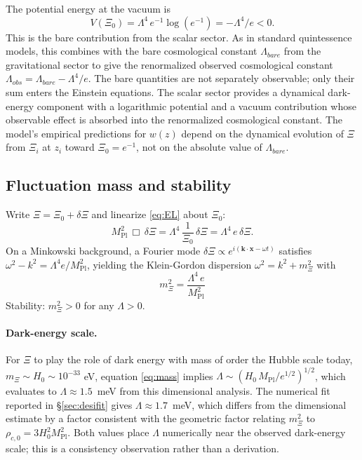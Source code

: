 \documentclass[11pt,reqno]{amsart}
\theoremstyle{plain}
\theoremstyle{definition}
\theoremstyle{remark}
\newcommand{\Pl}{\mathrm{Pl}}
\begin{document}
The potential energy at the vacuum is
\[
  V(\Xi_0) = \Lambda^{4}\,e^{-1} \log(e^{-1}) = -\Lambda^{4}/e < 0.
\]
This is the bare contribution from the scalar sector. As in standard
quintessence models, this combines with the bare cosmological constant
$\Lambda_{bare}$ from the gravitational sector to give the renormalized
observed cosmological constant $\Lambda_{obs} = \Lambda_{bare} - \Lambda^{4}/e$.
The bare quantities are not separately observable; only their sum enters
the Einstein equations. The scalar sector provides a dynamical
dark-energy component with a logarithmic potential and a vacuum
contribution whose observable effect is absorbed into the renormalized
cosmological constant. The model's empirical predictions for $w(z)$
depend on the dynamical evolution of $\Xi$ from $\Xi_i$ at $z_i$ toward
$\Xi_0 = e^{-1}$, not on the absolute value of $\Lambda_{bare}$.

\subsection{Fluctuation mass and stability}

Write $\Xi = \Xi_0 + \delta\Xi$ and linearize \eqref{eq:EL} about $\Xi_0$:
\[
  M_\Pl^{2}\,\Box\,\delta\Xi
  = \Lambda^{4}\,\frac{1}{\Xi_0}\,\delta\Xi
  = \Lambda^{4}\, e\,\delta\Xi.
\]
On a Minkowski background, a Fourier mode $\delta\Xi \propto e^{i(\mathbf{k}\cdot\mathbf{x} - \omega t)}$
satisfies $\omega^{2} - k^{2} = \Lambda^{4} e / M_\Pl^{2}$, yielding the
Klein-Gordon dispersion $\omega^{2} = k^{2} + m_\Xi^{2}$ with
\begin{equation}\label{eq:mass}
  \boxed{\;m_\Xi^{2} = \frac{\Lambda^{4}\,e}{M_\Pl^{2}}\;}
\end{equation}
Stability: $m_\Xi^{2} > 0$ for any $\Lambda > 0$.

\paragraph{Dark-energy scale.}
For $\Xi$ to play the role of dark energy with mass of order the Hubble
scale today, $m_\Xi \sim H_0 \sim 10^{-33}$ eV, equation \eqref{eq:mass}
implies $\Lambda \sim (H_0\, M_\Pl/e^{1/2})^{1/2}$, which evaluates to
$\Lambda \approx 1.5$~meV from this dimensional analysis. The numerical
fit reported in \S\ref{sec:desifit} gives $\Lambda \approx 1.7$~meV,
which differs from the dimensional estimate by a factor consistent with
the geometric factor relating $m_\Xi^{2}$ to $\rho_{c,0} = 3 H_0^{2}
M_\Pl^{2}$. Both values place $\Lambda$ numerically near the observed
dark-energy scale; this is a consistency observation rather than a
derivation.
\end{document}
